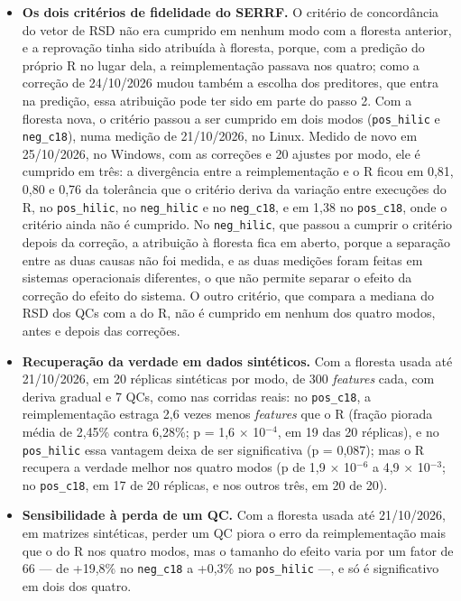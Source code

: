 \begin{itemize}
\item \textbf{Os dois critérios de fidelidade do SERRF.} O critério de concordância do vetor de RSD não era cumprido em nenhum modo com a floresta anterior, e a reprovação tinha sido atribuída à floresta, porque, com a predição do próprio R no lugar dela, a reimplementação passava nos quatro; como a correção de 24/10/2026 mudou também a escolha dos preditores, que entra na predição, essa atribuição pode ter sido em parte do passo 2. Com a floresta nova, o critério passou a ser cumprido em dois modos (\texttt{pos\_\allowbreak{}hilic} e \texttt{neg\_\allowbreak{}c18}), numa medição de 21/10/2026, no Linux. Medido de novo em 25/10/2026, no Windows, com as correções e 20 ajustes por modo, ele é cumprido em três: a divergência entre a reimplementação e o R ficou em 0,81, 0,80 e 0,76 da tolerância que o critério deriva da variação entre execuções do R, no \texttt{pos\_\allowbreak{}hilic}, no \texttt{neg\_\allowbreak{}hilic} e no \texttt{neg\_\allowbreak{}c18}, e em 1,38 no \texttt{pos\_\allowbreak{}c18}, onde o critério ainda não é cumprido. No \texttt{neg\_\allowbreak{}hilic}, que passou a cumprir o critério depois da correção, a atribuição à floresta fica em aberto, porque a separação entre as duas causas não foi medida, e as duas medições foram feitas em sistemas operacionais diferentes, o que não permite separar o efeito da correção do efeito do sistema. O outro critério, que compara a mediana do RSD dos QCs com a do R, não é cumprido em nenhum dos quatro modos, antes e depois das correções.
\item \textbf{Recuperação da verdade em dados sintéticos.} Com a floresta usada até 21/10/2026, em 20 réplicas sintéticas por modo, de 300 \textit{features} cada, com deriva gradual e 7 QCs, como nas corridas reais: no \texttt{pos\_\allowbreak{}c18}, a reimplementação estraga 2,6 vezes menos \textit{features} que o R (fração piorada média de 2,45\% contra 6,28\%; p = 1,6 $\times$ 10$^{-4}$, em 19 das 20 réplicas), e no \texttt{pos\_\allowbreak{}hilic} essa vantagem deixa de ser significativa (p = 0,087); mas o R recupera a verdade melhor nos quatro modos (p de 1,9 $\times$ 10$^{-6}$ a 4,9 $\times$ 10$^{-3}$; no \texttt{pos\_\allowbreak{}c18}, em 17 de 20 réplicas, e nos outros três, em 20 de 20).
\item \textbf{Sensibilidade à perda de um QC.} Com a floresta usada até 21/10/2026, em matrizes sintéticas, perder um QC piora o erro da reimplementação mais que o do R nos quatro modos, mas o tamanho do efeito varia por um fator de 66 --- de +19,8\% no \texttt{neg\_\allowbreak{}c18} a +0,3\% no \texttt{pos\_\allowbreak{}hilic} ---, e só é significativo em dois dos quatro.
\end{itemize}

